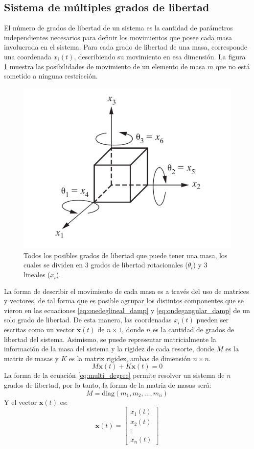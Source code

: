 \subsection{Sistema de múltiples grados de libertad}
El número de grados de libertad de un sistema es la cantidad de parámetros independientes necesarios para definir los movimientos que posee cada masa involucrada en el sistema. Para cada grado de libertad de una masa, corresponde una coordenada $x_i(t)$, describiendo su movimiento en esa dimensión. La figura \ref{fig:dof} muestra las posibilidades de movimiento de un elemento de masa $m$ que no está sometido a ninguna restricción.

\begin{figure}[h]
\centering
\includegraphics[width=0.5\linewidth]{Imagenes/dof.pdf}
\caption{Todos los posibles grados de libertad que puede tener una masa, los cuales se dividen en 3 grados de libertad rotacionales ($\theta_i$) y 3 lineales ($x_i$). \cite{inman2014engineering}}
\label{fig:dof}
\end{figure}

La forma de describir el movimiento de cada masa es a través del uso de matrices y vectores, de tal forma que es posible agrupar los distintos componentes que se vieron en las ecuaciones \ref{eq:onedeglineal_damp} y \ref{eq:ondegangular_damp} de un solo grado de libertad. De esta manera, las coordenadas $x_i(t)$ pueden ser escritas como un vector $\mathbf{x}(t)$ de $n \times 1$, donde $n$ es la cantidad de grados de libertad del sistema. Asimismo, se puede representar matricialmente la información de la masa del sistema y la rigidez de cada resorte, donde $\mathit{M}$ es la matriz de masas y $\mathit{K}$ es la matriz rigidez, ambas de dimensión $n \times n$. 
\begin{equation}\label{eq:multi_degree}
	\mathit{M}\mathbf{\ddot{x}}(t) + \mathit{K}\mathbf{x}(t) = 0
\end{equation}
La forma de la ecuación \ref{eq:multi_degree} permite resolver un sistema de $n$ grados de libertad, por lo tanto, la forma de la matriz de masas será:
\begin{equation*}
	\mathit{M}=\text{diag}(m_1,m_2,...,m_n)
\end{equation*}
Y el vector $\mathbf{x}(t)$ es:
\begin{equation*}
	\mathbf{x}(t) = \begin{bmatrix}
	x_1(t)\\
	x_2(t)\\
	\vdots\\
	x_n(t)
	\end{bmatrix}
\end{equation*} 


